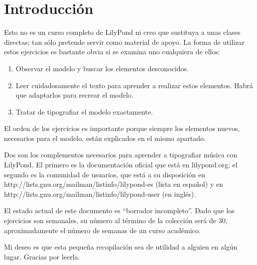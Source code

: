 \section*{Introducción}

Esto no es un curso completo de LilyPond ni creo que sustituya a unas
clases directas; tan sólo pretende servir como material de apoyo. La
forma de utilizar estos ejercicios es bastante obvia si se examina uno
cualquiera de ellos:

\begin{enumerate}
\item Observar el modelo y buscar los elementos desconocidos.

\item Leer cuidadosamente el texto para aprender a realizar estos
  elementos.  Habrá que adaptarlos para recrear el modelo.

\item Tratar de tipografiar el modelo exactamente.

\end{enumerate}

El orden de los ejercicios es importante porque siempre los elementos
nuevos, necesarios para el modelo, están explicados en el mismo
apartado.

Dos son los complementos necesarios para aprender a tipografiar música
con LilyPond.  El primero es la documentación oficial que está en
lilypond.org; el segundo es la comunidad de usuarios, que está a su
disposición en http://lists.gnu.org/mailman/listinfo/lilypond-es
(lista en español) y en
http://lists.gnu.org/mailman/listinfo/lilypond-user (en inglés).

El estado actual de este documento es ``borrador incompleto''.  Dado
que los ejercicios son semanales, su número al término de la colección
será de 30, aproximadamente el número de semanas de un curso
académico.


Mi deseo es que esta pequeña recopilación sea de utilidad a alguien en
algún lugar.  Gracias por leerla.


